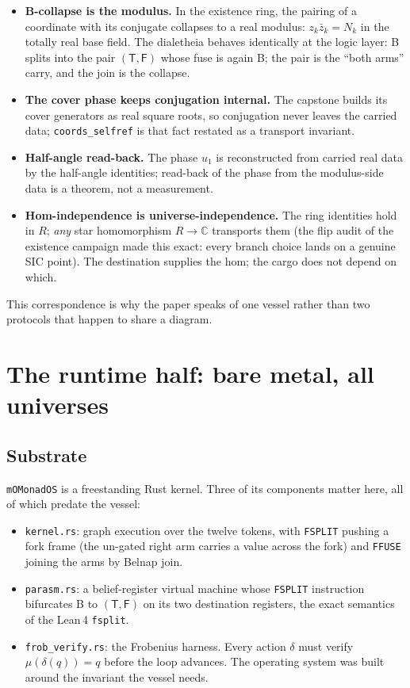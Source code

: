 \documentclass[12pt,a4paper]{article}
\newcommand{\Lean}{\textsf{Lean}\,4}
\newcommand{\bT}{\textsf{T}}
\newcommand{\bF}{\textsf{F}}
\newcommand{\bB}{\textsf{B}}
\begin{document}
\begin{itemize}
\item \textbf{B-collapse is the modulus.} In the existence ring, the
pairing of a coordinate with its conjugate collapses to a real modulus:
$z_k \bar{z}_k = N_k$ in the totally real base field. The dialetheia
behaves identically at the logic layer: \bB{} splits into the pair
$(\bT, \bF)$ whose fuse is again \bB{}; the pair is the ``both arms''
carry, and the join is the collapse.
\item \textbf{The cover phase keeps conjugation internal.} The capstone
builds its cover generators as real square roots, so conjugation never
leaves the carried data; \texttt{coords\_selfref} is that fact restated
as a transport invariant.
\item \textbf{Half-angle read-back.} The phase $u_1$ is reconstructed
from carried real data by the half-angle identities; read-back of the
phase from the modulus-side data is a theorem, not a measurement.
\item \textbf{Hom-independence is universe-independence.} The ring
identities hold in $R$; \emph{any} star homomorphism $R \to \mathbb{C}$
transports them (the flip audit of the existence campaign made this
exact: every branch choice lands on a genuine SIC point). The
destination supplies the hom; the cargo does not depend on which.
\end{itemize}

This correspondence is why the paper speaks of one vessel rather than two
protocols that happen to share a diagram.

\section{The runtime half: bare metal, all universes}
\label{sec:runtime}

\subsection{Substrate}

\texttt{mOMonadOS} is a freestanding Rust kernel. Three of its components
matter here, all of which predate the vessel:
\begin{itemize}
\item \texttt{kernel.rs}: graph execution over the twelve tokens, with
\texttt{FSPLIT} pushing a fork frame (the un-gated right arm carries a
value across the fork) and \texttt{FFUSE} joining the arms by Belnap
join.
\item \texttt{parasm.rs}: a belief-register virtual machine whose
\texttt{FSPLIT} instruction bifurcates \bB{} to $(\bT, \bF)$ on its two
destination registers, the exact semantics of the \Lean{}
\texttt{fsplit}.
\item \texttt{frob\_verify.rs}: the Frobenius harness. Every action
$\delta$ must verify $\mu(\delta(q)) = q$ before the loop advances.
The operating system was built around the invariant the vessel needs.
\end{itemize}
\end{document}
